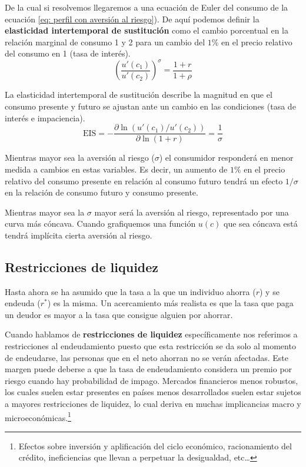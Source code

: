 De la cual si resolvemos llegaremos a una ecuación de Euler del consumo de la ecuación \ref{eq: perfil con aversión al riesgo}). De aquí podemos definir la \textbf{elasticidad intertemporal de sustitución} como el cambio porcentual en la relación marginal de consumo 1 y 2 para un cambio del $1\%$ en el precio relativo del consumo en 1 (tasa de interés). 
\begin{equation}
    \left( \frac{u'(c_1)}{u'(c_2)} \right) ^\sigma=  \frac{1+r}{1+\rho}  \label{eq: perfil con aversión al riesgo}
\end{equation}

La elasticidad intertemporal de sustitución describe la magnitud en que el consumo presente y futuro se ajustan ante un cambio en las condiciones (tasa de interés e impaciencia). 
\begin{equation}
    \text{EIS} = - \frac{\partial \ln (u'(c_1)/u'(c_2))}{\partial \ln (1+r)} = \frac{1}{\sigma}
\end{equation}

Mientras mayor sea la aversión al riesgo ($\sigma$) el consumidor responderá en menor medida a cambios en estas variables. Es decir, un aumento de $1\%$ en el precio relativo del consumo presente en relación al consumo futuro tendrá un efecto $1/\sigma$ en la relación de consumo futuro y consumo presente.

Mientras mayor sea la $\sigma$ mayor será la aversión al riesgo, representado por una curva más cóncava. Cuando grafiquemos una función $u(c)$ que sea cóncava está tendrá implícita cierta aversión al riesgo.

\subsection{Restricciones de liquidez}

Hasta ahora se ha asumido que la tasa a la que un individuo ahorra ($r$) y se endeuda ($r^*$) es la misma. Un acercamiento más realista es que la tasa que paga un deudor es mayor a la tasa que consigue alguien por ahorrar. 

Cuando hablamos de \textbf{restricciones de liquidez} específicamente nos referimos a restricciones al endeudamiento puesto que esta restricción se da solo al momento de endeudarse, las personas que en el neto ahorran no se verán afectadas. Este margen puede deberse a que la tasa de endeudamiento considera un premio por riesgo cuando hay probabilidad de impago. Mercados financieros menos robustos, los cuales suelen estar presentes en países menos desarrollados suelen estar sujetos a mayores restricciones de liquidez, lo cual deriva en muchas implicancias macro y microeconómicas.\footnote{Efectos sobre inversión y aplificación del ciclo económico, racionamiento del crédito, ineficiencias que llevan a perpetuar la desigualdad, etc\ldots}

